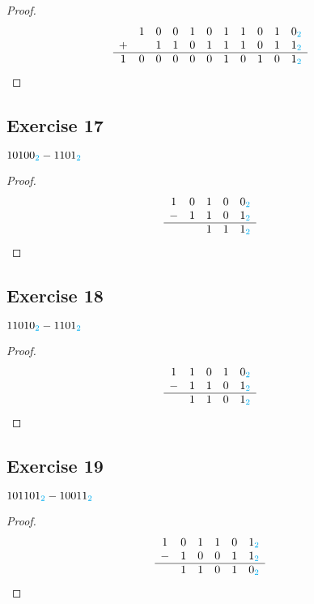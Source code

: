 \documentclass[14pt]{extarticle}
\newcommand{\base}[1]{{\color{cyan}#1}}
\begin{document}
\begin{proof}
    $$
        \begin{array}{ccccccccccc}
              & 1 & 0 & 0 & 1 & 0 & 1 & 1 & 0 & 1 & 0_\base{2} \\
            + &   & 1 & 1 & 0 & 1 & 1 & 1 & 0 & 1 & 1_\base{2} \\
            \hline
            1 & 0 & 0 & 0 & 0 & 0 & 1 & 0 & 1 & 0 & 1_\base{2} \\
        \end{array}
    $$
\end{proof}

\subsection{Exercise 17}
$10100_\base{2} - 1101_\base{2}$

\begin{proof}
    $$
        \begin{array}{ccccc}
            1 & 0 & 1 & 0 & 0_\base{2} \\
            - & 1 & 1 & 0 & 1_\base{2} \\
            \hline
              &   & 1 & 1 & 1_\base{2} \\
        \end{array}
    $$
\end{proof}

\subsection{Exercise 18}
$11010_\base{2} - 1101_\base{2}$

\begin{proof}
    $$
        \begin{array}{ccccc}
            1 & 1 & 0 & 1 & 0_\base{2} \\
            - & 1 & 1 & 0 & 1_\base{2} \\
            \hline
              & 1 & 1 & 0 & 1_\base{2} \\
        \end{array}
    $$
\end{proof}

\subsection{Exercise 19}
$101101_\base{2} - 10011_\base{2}$

\begin{proof}
    $$
        \begin{array}{cccccc}
            1 & 0 & 1 & 1 & 0 & 1_\base{2} \\
            - & 1 & 0 & 0 & 1 & 1_\base{2} \\
            \hline
              & 1 & 1 & 0 & 1 & 0_\base{2} \\
        \end{array}
    $$
\end{proof}
\end{document}
